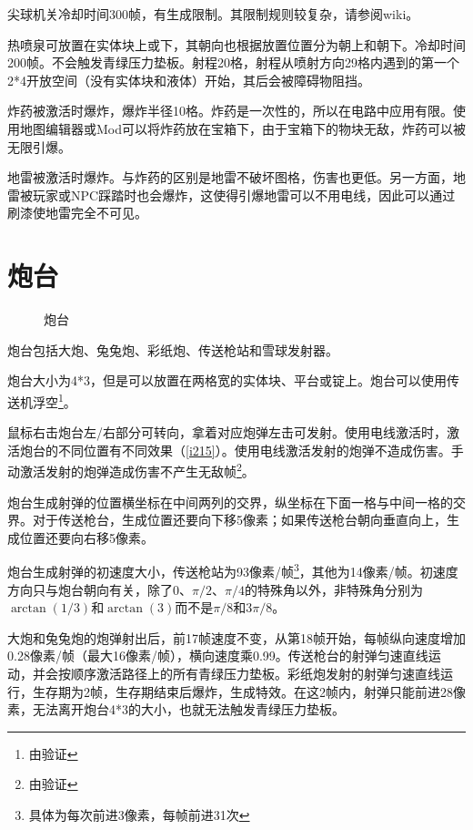 尖球机关冷却时间300帧，有生成限制。其限制规则较复杂，请参阅wiki。

热喷泉可放置在实体块上或下，其朝向也根据放置位置分为朝上和朝下。冷却时间200帧。不会触发青绿压力垫板。射程20格，射程从喷射方向29格内遇到的第一个2*4开放空间（没有实体块和液体）开始，其后会被障碍物阻挡。

炸药被激活时爆炸，爆炸半径10格。炸药是一次性的，所以在电路中应用有限。使用地图编辑器或Mod可以将炸药放在宝箱下，由于宝箱下的物块无敌，炸药可以被无限引爆。

地雷被激活时爆炸。与炸药的区别是地雷不破坏图格，伤害也更低。另一方面，地雷被玩家或NPC踩踏时也会爆炸，这使得引爆地雷可以不用电线，因此可以通过刷漆使地雷完全不可见。

\section{炮台}
\begin{figure}[!ht]
\centering
{}\qquad
{}\qquad
{}\qquad
{}\qquad
{}
\caption{炮台}
\end{figure}
炮台包括大炮、兔兔炮、彩纸炮、传送枪站和雪球发射器。

炮台大小为4*3，但是可以放置在两格宽的实体块、平台或锭上。炮台可以使用传送机浮空\footnote{由验证}。

鼠标右击炮台左/右部分可转向，拿着对应炮弹左击可发射。使用电线激活时，激活炮台的不同位置有不同效果（\autoref{i215}）。使用电线激活发射的炮弹不造成伤害。手动激活发射的炮弹造成伤害不产生无敌帧\footnote{由验证}。

炮台生成射弹的位置横坐标在中间两列的交界，纵坐标在下面一格与中间一格的交界。对于传送枪台，生成位置还要向下移5像素；如果传送枪台朝向垂直向上，生成位置还要向右移5像素。

炮台生成射弹的初速度大小，传送枪站为93像素/帧\footnote{具体为每次前进3像素，每帧前进31次}，其他为14像素/帧。初速度方向只与炮台朝向有关，除了0、$\pi/2$、$\pi/4$的特殊角以外，非特殊角分别为$\arctan(1/3)$和$\arctan(3)$而不是$\pi/8$和$3\pi/8$。

大炮和兔兔炮的炮弹射出后，前17帧速度不变，从第18帧开始，每帧纵向速度增加0.28像素/帧（最大16像素/帧），横向速度乘0.99。传送枪台的射弹匀速直线运动，并会按顺序激活路径上的所有青绿压力垫板。彩纸炮发射的射弹匀速直线运行，生存期为2帧，生存期结束后爆炸，生成特效。在这2帧内，射弹只能前进28像素，无法离开炮台4*3的大小，也就无法触发青绿压力垫板。

